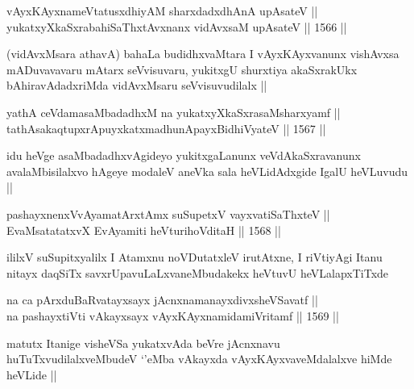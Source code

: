 

\begin{shl}
vAyxKAyxnameVtatusxdhiyAM sharxdadxdhAnA upAsateV || \\
yukatxyXkaSxrabahiSaThxtAvxnanx vidAvxsaM upAsateV ||  1566 ||  
\end{shl}

\begin{artha}
(vidAvxMsara athavA) bahaLa budidhxvaMtara I vAyxKAyxvanunx vishAvxsa mADuvavavaru mAtarx seVvisuvaru, yukitxgU shurxtiya akaSxrakUkx bAhiravAdadxriMda vidAvxMsaru seVvisuvudilalx ||
\end{artha}

\begin{shl}
yathA ceVdamasaMbadadhxM na yukatxyXkaSxrasaMsharxyamf || \\
tathA\s sakaqtupxrA\s puyxkatxmadhunA\s payxBidhiVyateV ||  1567 ||  
\end{shl}

\begin{artha}
idu heVge asaMbadadhxvAgideyo yukitxgaLanunx veVdAkaSxravanunx avalaMbisilalxvo hAgeye modaleV aneVka sala heVLidAdxgide IgalU heVLuvudu ||
\end{artha}


\begin{shl}
pashayxnenxVvAyamatArx\s \s tAmx suSupetxV vayxvatiSaThxteV ||  \\
EvaMsatatatxvX EvAyamiti heVturihoVditaH ||  1568 ||  
\end{shl}

\begin{artha}
ililxV suSupitxyalilx I Atamxnu noVDutatxleV irutAtxne, I riVtiyAgi Itanu nitayx daqSiTx savxrUpavuLaLxvaneMbudakekx heVtuvU heVLalapxTiTxde
\end{artha}

\begin{shl}
na ca pArxduBaRvatayxsayx jAcnxnamanayxdivxsheVSavatf ||  \\
na pashayxtiVti vAkayxsayx vAyxKAyxnamidamiVritamf ||  1569 ||  
\end{shl}

\begin{artha}
matutx Itanige visheVSa yukatxvAda beVre jAcnxnavu huTuTxvudilalxveMbudeV `\stext'eMba vAkayxda vAyxKAyxvaveMdalalxve hiMde heVLide ||
\end{artha}


